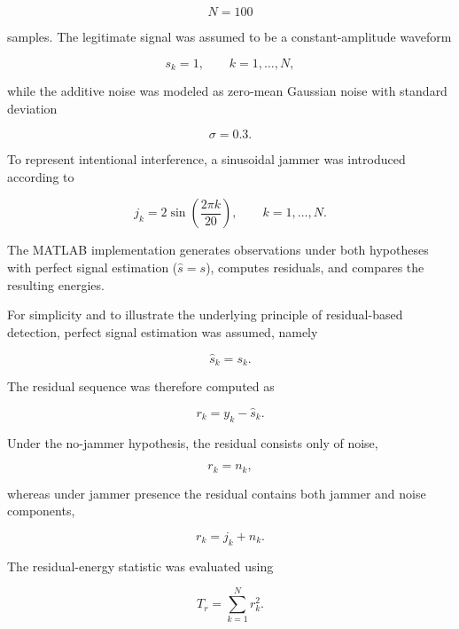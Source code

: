 \documentclass{article}
\begin{document}
\begin{equation}
N=100
\end{equation}

samples. The legitimate signal was assumed to be a constant-amplitude waveform

\begin{equation}
s_k = 1,
\qquad k=1,\ldots,N,
\end{equation}

while the additive noise was modeled as zero-mean Gaussian noise with standard deviation

\begin{equation}
\sigma = 0.3.
\end{equation}

To represent intentional interference, a sinusoidal jammer was introduced according to

\begin{equation}
j_k
=
2\sin\!\left(\frac{2\pi k}{20}\right),
\qquad k=1,\ldots,N.
\end{equation}

The MATLAB implementation generates observations under both hypotheses with perfect signal estimation ($\hat{s} = s$), computes residuals, and compares the resulting energies.

For simplicity and to illustrate the underlying principle of residual-based detection, perfect signal estimation was assumed, namely

\begin{equation}
\hat{s}_k=s_k.
\end{equation}

The residual sequence was therefore computed as

\begin{equation}
r_k=y_k-\hat{s}_k.
\end{equation}

Under the no-jammer hypothesis, the residual consists only of noise,

\begin{equation}
r_k=n_k,
\end{equation}

whereas under jammer presence the residual contains both jammer and noise components,

\begin{equation}
r_k=j_k+n_k.
\end{equation}

The residual-energy statistic was evaluated using

\begin{equation}
T_r
=
\sum_{k=1}^{N} r_k^2.
\end{equation}
\end{document}
